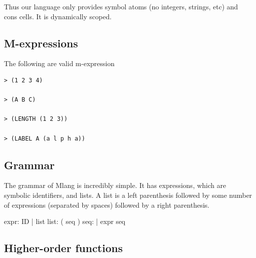 \documentclass[letterpaper,11pt]{article}
\begin{document}
{Thus our language only provides symbol atoms (no integers, strings, etc)
and cons cells. It is dynamically scoped.


\subsection{M-expressions}


The following are valid m-expression
\lstset{breaklines=true,language=Lisp}
\begin{lstlisting}
> (1 2 3 4)

> (A B C)

> (LENGTH (1 2 3))

> (LABEL A (a l p h a))

\end{lstlisting}
\subsection{Grammar}


The grammar of Mlang is incredibly simple.
It has expressions, which are symbolic identifiers, and lists.
A list is a left parenthesis followed by some number of expressions (separated by spaces) followed by a right parenthesis.

expr:   ID | list
list:   ( seq )  
seq:       | expr seq

\subsection{Higher-order functions}

}
\end{document}
